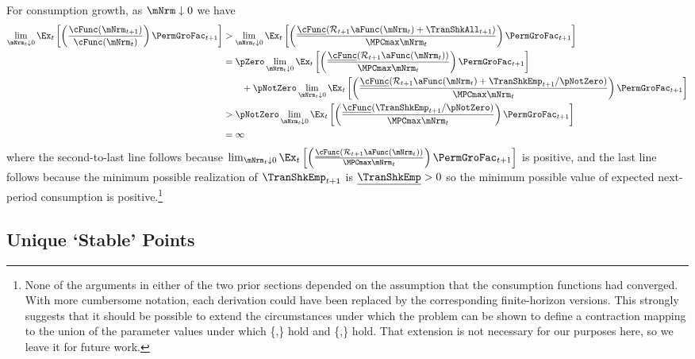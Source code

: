 \documentclass[BufferStockTheory]{subfiles}
\begin{document}
For consumption growth, as $\mNrm \downarrow 0$ we have
\begin{align*}
  \lim_{\mNrm_{t} \downarrow 0} \Ex_{t}\left[\left(\frac{\cFunc({\mNrm}_{t+1})}{\cFunc(\mNrm_t)}\right){\PermGroFac}_{t+1}\right]
  & > \lim_{\mNrm_{t} \downarrow 0} \Ex_{t}\left[\left(\frac{\underline{\cFunc}({\mathcal{\mathcal{R}}}_{t+1}\aFunc(\mNrm_{t})+{%
    \TranShkAll}_{t+1})}{\MPCmax \mNrm_{t}}\right){\PermGroFac}_{t+1}\right]  \notag \\
  & = \pZero \lim_{\mNrm_{t} \downarrow 0} \Ex_{t}\left[\left(\frac{\underline{\cFunc}({\mathcal{\mathcal{R}}}_{t+1}\aFunc(\mNrm_{t}))}{\MPCmax \mNrm_{t}}\right){\PermGroFac}_{t+1}\right] \\
  & ~~~~~~ + \pNotZero \lim_{\mNrm_{t} \downarrow 0}  \Ex_{t}\left[\left(\frac{\underline{\cFunc}({\mathcal{\mathcal{R}}}_{t+1}\aFunc(\mNrm_{t})+
    \TranShkEmp_{t+1}/\pNotZero)}{\MPCmax \mNrm_{t}}\right){\PermGroFac}_{t+1}\right]  \\\notag
  & > \pNotZero \lim_{\mNrm_{t} \downarrow 0} \Ex_{t}\left[\left(\frac{\underline{\cFunc}(
    \TranShkEmp_{t+1}/\pNotZero)}{\MPCmax \mNrm_{t}}\right){\PermGroFac}_{t+1}\right] \\
  & = \infty \nonumber
\end{align*}
where the second-to-last line follows because  $\lim_{\mNrm_{t} \downarrow 0} \Ex_{t}\left[\left(\frac{\underline{\cFunc}({\mathcal{\mathcal{R}}}_{t+1}\aFunc(\mNrm_{t}))}{\MPCmax \mNrm_{t}}\right){\PermGroFac}_{t+1}\right]$ is positive, and the last line follows because the minimum possible realization of $\TranShkEmp_{t+1}$ is $\underline{\TranShkEmp}>0$ so the minimum possible value of expected next-period consumption is positive.\footnote{None of the arguments in either of the two prior sections depended on the assumption that the consumption functions had converged.  With more cumbersome notation, each derivation could have been replaced by the corresponding finite-horizon versions.  This strongly suggests that it should be possible to extend the circumstances under which the problem can be shown to define a contraction mapping to the union of the parameter values under which \{\RIC,\FHWC\} hold and \{\FVAC,\WRIC\} hold.  That extension is not necessary for our purposes here, so we leave it for future work.}

\hypertarget{onetarget}{}
\hypertarget{Unique-Stable-Points}{}

\subsection{Unique `Stable' Points}\label{subsec:onetarget}\hypertarget{TheoremTarget}{}
\end{document}
